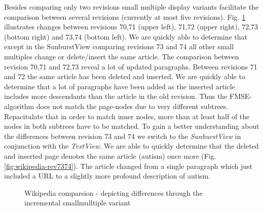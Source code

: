 Besides comparing only two revisions small multiple display variants facilitate the comparison between several revisions (currently at most five revisions). Fig. \ref{fig:wikipedia-incremental} illustrates changes between revisions 70,71 (upper left), 71,72 (upper right), 72,73 (bottom right) and 73,74 (bottom left). We are quickly able to determine that except in the SunburstView comparing revisions 73 and 74 all other small multiples change or delete/insert the same article. The comparison between revision 70,71 and 72,73 reveal a lot of updated paragraphs. Between revisions 71 and 72 the same article has been deleted and inserted. We are quickly able to determine that a lot of paragraphs have been added as the inserted article includes more descendants than the article in the old revision. Thus the FMSE-algorithm does not match the page-nodes due to very different subtrees. Repacitulate that in order to match inner nodes, more than at least half of the nodes in both subtrees have to be matched. To gain a better understanding about the differences between revision 73 and 74 we switch to the \emph{SunburstView} in conjunction with the \emph{TextView}. We are able to quickly determine that the deleted and inserted page denotes the same article (autism) once more (Fig. \ref{fig:wikipedia-rev7374}). The article changed from a single paragraph which just included a URL to a slightly more profound description of autism.

\begin{figure}[tb]
\caption{\label{fig:wikipedia-incremental} Wikipedia comparsion - depicting differences through the incremental smallmulltiple variant}
\end{figure}

